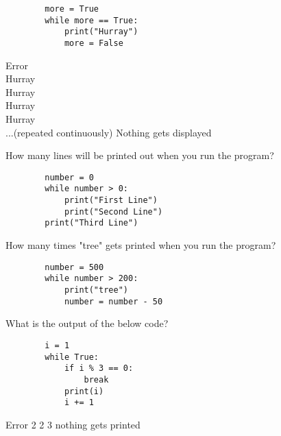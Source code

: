 \documentclass{exam}
\begin{document}
\begin{questions}
    \begin{verbatim}
        more = True
        while more == True:
            print("Hurray")
            more = False
    \end{verbatim}

    \begin{oneparchoices}
        \choice Error \\
        \choice Hurray \\
        \choice Hurray\\ Hurray\\ Hurray \\...(repeated continuously)
        \choice Nothing gets displayed
    \end{oneparchoices}

    \question How many lines will be printed out when you run the program?

    \begin{verbatim}
        number = 0
        while number > 0:
            print("First Line")
            print("Second Line")
        print("Third Line")
    \end{verbatim}
    \begin{oneparchoices}
    \end{oneparchoices}

    \question How many times "tree" gets printed when you run the program?

    \begin{verbatim}
        number = 500
        while number > 200:
            print("tree")
            number = number - 50
    \end{verbatim}

    \begin{oneparchoices}
    \end{oneparchoices}

    \question What is the output of the below code?

    \begin{verbatim}
        i = 1
        while True:
            if i % 3 == 0:
                break
            print(i)
            i += 1
    \end{verbatim}

    \begin{oneparchoices}
        \choice Error
         2
         2 3
        \choice nothing gets printed
    \end{oneparchoices}


\end{questions}
\end{document}
